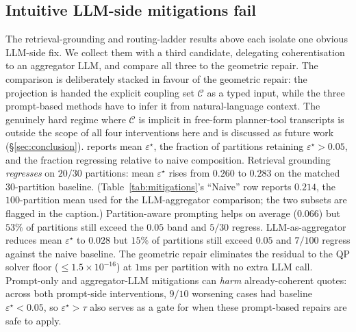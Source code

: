 \documentclass{article}
\theoremstyle{plain}
\theoremstyle{definition}
\theoremstyle{remark}
\newcommand{\Cset}{\mathcal{C}}
\newcommand{\eps}{\varepsilon}
\begin{document}
\subsection{Intuitive LLM-side mitigations fail}
\label{subsec:mitigations}

The retrieval-grounding and routing-ladder results above each
isolate one obvious LLM-side fix. We collect them with a third
candidate, delegating coherentisation to an aggregator LLM, and
compare all three to the geometric repair. The comparison is
deliberately stacked in favour of the geometric repair: the
projection is handed the explicit coupling set $\Cset$ as a
typed input, while the three prompt-based methods have to infer
it from natural-language context. The genuinely hard regime
where $\Cset$ is implicit in free-form planner-tool transcripts
is outside the scope of all four interventions here and is
discussed as future work (\S\ref{sec:conclusion}).
 reports mean $\eps^\star$, the fraction of
partitions retaining $\eps^\star\!>\!0.05$, and the fraction
regressing relative to naive composition. Retrieval grounding
\emph{regresses} on $20/30$ partitions: mean $\eps^\star$ rises
from $0.260$ to $0.283$ on the matched $30$-partition baseline.
(Table~\ref{tab:mitigations}'s ``Naive'' row reports $0.214$, the
$100$-partition mean used for the LLM-aggregator comparison; the
two subsets are flagged in the caption.) Partition-aware prompting
helps on
average ($0.066$) but $53\%$ of partitions still exceed the $0.05$
band and $5/30$ regress. LLM-as-aggregator reduces mean
$\eps^\star$ to $0.028$ but $15\%$ of partitions still exceed
$0.05$ and $7/100$ regress against the naive baseline. The
geometric repair eliminates the residual to the QP solver floor
($\le 1.5\!\times\!10^{-16}$) at $1$ms per partition with no
extra LLM call. Prompt-only and aggregator-LLM mitigations can
\emph{harm} already-coherent quotes: across both prompt-side
interventions, $9/10$ worsening cases had baseline
$\eps^\star\!<\!0.05$, so $\eps^\star\!>\!\tau$ also serves as a
gate for when these prompt-based repairs are safe to apply.

\begin{table}[h]
\centering
\small

\caption{\textbf{Three intuitive LLM-side mitigations vs.\ the
geometric repair.} Rows use the evaluation subset for the
corresponding mitigation: retrieval-augmented and partition-aware
prompt on $30$ matched partitions; naive, LLM-aggregator, and
hierarchical JCD on $100$ partitions. The geometric repair
deterministically eliminates $\eps^\star$ without extra LLM
calls.}
\label{tab:mitigations}
\end{table}
\end{document}
